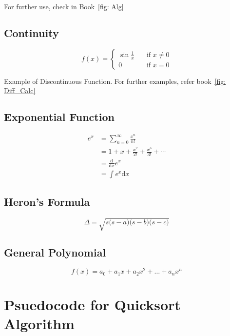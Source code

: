 \documentclass{article}
\begin{document}
For further use, check in Book~\ref{fig: Alg}
    
    \subsection{Continuity}
    
    \[ f(x) =
    \begin{cases}
    	\sin \frac{1}{x}      & \quad \text{if } x\neq0\\
    	0  & \quad \text{if } x=0
    \end{cases}
    \]
    
    Example of Discontinuous Function. For further examples, refer book~\ref{fig: Diff_Calc}
    
    \subsection{Exponential Function}
    
    \begin{align}
    	e^x & =  \sum_{n=0}^{\infty} \frac{x^n}{n!} \\
    	      & =  1 + x + \frac{x^2}{2!} + \frac{x^3}{3!} + \cdots \\
    	      & =   \frac{\mathrm d}{\mathrm d x} e^x \\
    	      & =  \int e^x {\mathrm d x}
    \end{align}

    \subsection{Heron's Formula}
    
    \begin{equation}
	\Delta = \sqrt{s\big(s-a \big)\big(s-b \big)\big(s-c \big)}
    \end{equation}

    \subsection{General Polynomial}
    
      \[f(x)= a_0 + a_1x + a_2x^2 +\dots + a_nx^n \]

    \section{Psuedocode for Quicksort Algorithm}
    \pagecolor[HTML]{ecf0cc}
    
\end{document}
